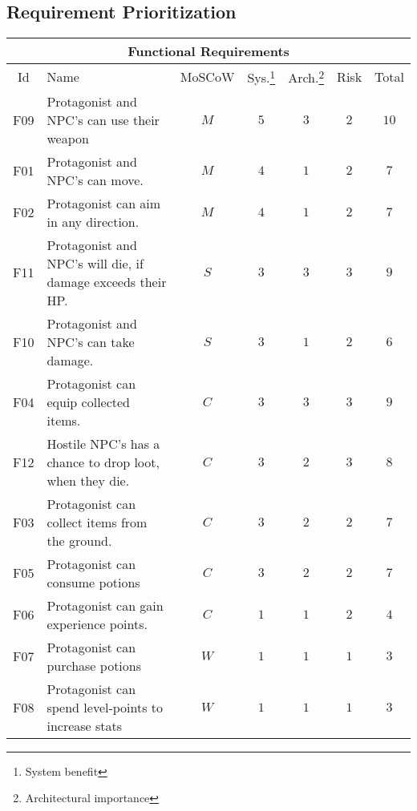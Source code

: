 \documentclass[11pt]{article}
\begin{document}
\subsection*{Requirement Prioritization\\[.2cm]}
\begin{tabularx}{\textwidth}{|c|X||c||c|c|c||c|}

	\hline \multicolumn{7}{|c|}{\cellcolor{gray!50}\textbf{Functional Requirements}} \\\hline
 	Id  & Name & MoSCoW & Sys.\footnote{System benefit} & Arch.\footnote{Architectural importance} & Risk & Total\\\hline
 	F09 & Protagonist and NPC's can use their weapon & $M$ & $5$ & $3$ & $2$ & $10$ \\\hline
 	F01 & Protagonist and NPC's can move. & $M$ & $4$ & $1$ & $2$ & $7$ \\\hline
 	F02 & Protagonist can aim in any direction. & $M$ & $4$ & $1$ & $2$ & $7$ \\\hline\hline
 	F11 & Protagonist and NPC's will die, if damage exceeds their HP. & $S$ & $3$ & $3$ & $3$ & $9$ \\\hline
 	F10 & Protagonist and NPC's can take damage. & $S$ & $3$ & $1$ & $2$ & $6$ \\\hline\hline
 	F04 & Protagonist can equip collected items. & $C$ & $3$ & $3$ & $3$ & $9$ \\\hline
 	F12 & Hostile NPC's has a chance to drop loot, when they die. & $C$ & $3$ & $2$ & $3$ & $8$ \\\hline
 	F03 & Protagonist can collect items from the ground. & $C$ & $3$ & $2$ & $2$ & $7$ \\\hline
 	F05 & Protagonist can consume potions & $C$ & $3$ & $2$ & $2$ & $7$ \\\hline
 	F06 & Protagonist can gain experience points. & $C$ & $1$ & $1$ & $2$ & $4$ \\\hline\hline
 	F07 & Protagonist can purchase potions & $W$ & $1$ & $1$ & $1$ & $3$ \\\hline
 	F08 & Protagonist can spend level-points to increase stats & $W$ & $1$ & $1$ & $1$ & $3$ \\\hline

\end{tabularx}
\end{document}
